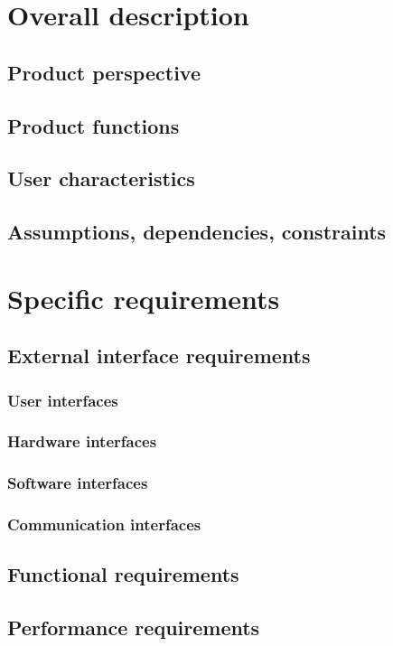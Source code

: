 \documentclass[12pt]{article}
\begin{document}
\section{Overall description}
\label{sec:overdesc}

  \subsection{Product perspective}
  \subsection{Product functions}
  \subsection{User characteristics}
  \subsection{Assumptions, dependencies, constraints}

\clearpage
\section{Specific requirements}
\label{sec:specreq}

  \subsection{External interface requirements}
    \subsubsection{User interfaces}
    \subsubsection{Hardware interfaces}
    \subsubsection{Software interfaces}
    \subsubsection{Communication interfaces}
  \subsection{Functional requirements}
  \subsection{Performance requirements}
\end{document}
